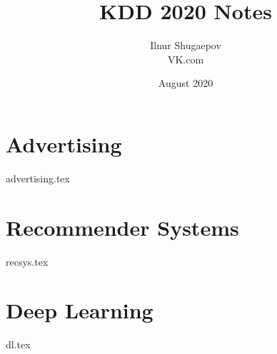 \documentclass[openany,11pt]{book}
\title{KDD 2020 Notes}
\author{Ilnur Shugaepov \\ VK.com}
\date{August 2020}
\begin{document}
\maketitle
\setcounter{tocdepth}{0}
\small{\tableofcontents}
\newpage


\newpage
\part{Advertising}
{advertising.tex}

\newpage
\part{Recommender Systems}
{recsys.tex}

\newpage
\part{Deep Learning}
{dl.tex}
\end{document}
